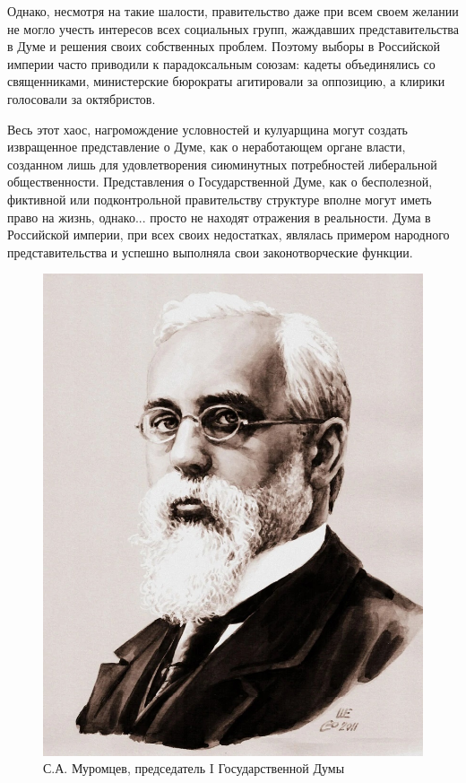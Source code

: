 Однако, несмотря на такие шалости, правительство даже при всем своем желании не могло учесть интересов всех социальных групп, жаждавших представительства в Думе и решения своих собственных проблем. Поэтому выборы в Российской империи часто приводили к парадоксальным союзам: кадеты объединялись со священниками, министерские бюрократы агитировали за оппозицию, а клирики голосовали за октябристов.

Весь этот хаос, нагромождение условностей и кулуарщина могут создать извращенное представление о Думе, как о неработающем органе власти, созданном лишь для удовлетворения сиюминутных потребностей либеральной общественности. Представления о Государственной Думе, как о бесполезной, фиктивной или подконтрольной правительству структуре вполне могут иметь право на жизнь, однако... просто не находят отражения в реальности. Дума в Российской империи, при всех своих недостатках, являлась примером народного представительства и успешно выполняла свои законотворческие функции.

\begin{figure}[h!tb] 
	\centering\includegraphics[scale=0.3]{Data/Vybory_V_Dumu/V4ftB5UZj5w.jpg}
	\caption{С.А. Муромцев, председатель I Государственной Думы}%
\end{figure}

